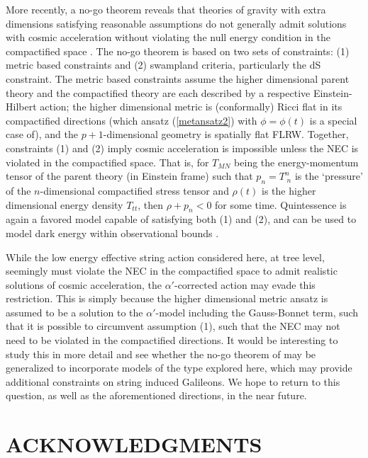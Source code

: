 \documentclass[amsmath,amssymb,11pt]{article}
\begin{document}
More recently, a no-go theorem reveals that theories of gravity with extra dimensions satisfying reasonable assumptions do not generally admit solutions with cosmic acceleration without violating the null energy condition in the compactified space \cite{Montefalcone:2020vlu}. The no-go theorem is based on two sets of constraints: (1) metric based constraints and (2) swampland criteria, particularly the dS constraint. The metric based constraints assume the higher dimensional parent theory and the compactified theory are each described by a respective Einstein-Hilbert action; the higher dimensional metric is (conformally) Ricci flat in its compactified directions (which ansatz (\ref{metansatz2}) with $\phi=\phi(t)$ is a special case of), and the $p+1$-dimensional geometry is spatially flat FLRW. Together, constraints (1) and (2) imply cosmic acceleration is impossible unless the NEC is violated in the compactified space. That is, for $T_{MN}$ being the energy-momentum tensor of the parent theory (in Einstein frame) such that $p_{n}=T^{n}_{\;n}$ is the `pressure' of the $n$-dimensional compactified stress tensor and $\rho(t)$ is the higher dimensional energy density $T_{tt}$, then $\rho+p_{n}<0$ for some time. Quintessence is again a favored model capable of satisfying both (1) and (2), and can be used to model dark energy within observational bounds \cite{Montefalcone:2020vlu}.  

While the low energy effective string action considered here, at tree level, seemingly must violate the NEC in the compactified space to admit realistic solutions of cosmic acceleration, the $\alpha'$-corrected action may evade this restriction. This is simply because the higher dimensional metric ansatz is assumed to be a solution to the $\alpha'$-model including the Gauss-Bonnet term, such that it is possible to circumvent assumption (1), such that the NEC may not need to be violated in the compactified directions. It would be interesting to study this in more detail and see whether the no-go theorem of \cite{Montefalcone:2020vlu} may be generalized to incorporate models of the type explored here, which may provide additional constraints on string induced Galileons. We hope to return to this question, as well as the aforementioned directions, in the near future. 





\noindent\section*{ACKNOWLEDGMENTS}
\end{document}
